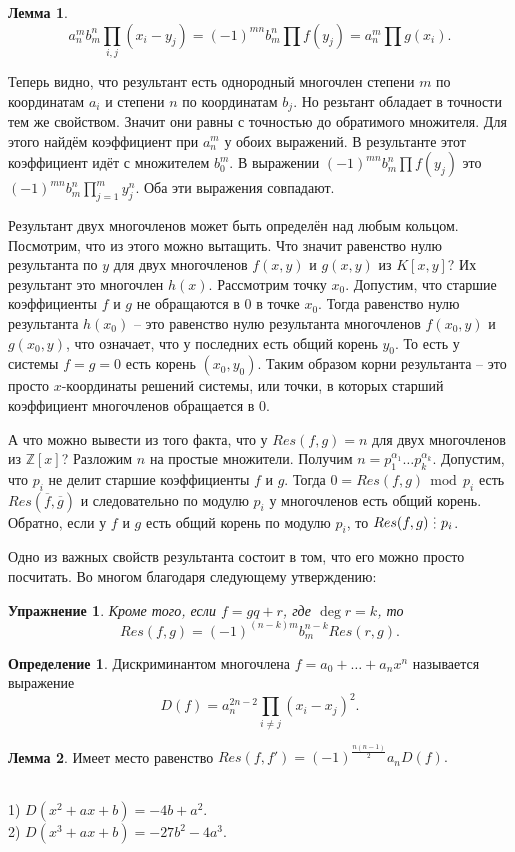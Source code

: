 \documentclass[10pt,a4paper,oneside]{book}
\newtheorem{upr}{Упражнение}
\theoremstyle{definition}
\newtheorem*{defn}{{\color{yellow!20!red} Определение}}
\newtheorem{lem}{Лемма}
\renewcommand{\mod}{\,\operatorname{mod}\,}
\newcommand{\mb}[1]{\mathbb{#1}}
\newcommand{\ovl}{\overline}
\newcommand{\di}{\mathop{\,\scalebox{0.85}{\raisebox{-1.2pt}[0.5\height]{\vdots}}\,}}
\def\exm{\noindent {\bf Примеры:}}
\def\dfn{\begin{defn}}
\def\edfn{\end{defn}}
\def\lm{\begin{lem}}
\def\elm{\end{lem}}
\def\bupr{\begin{upr}}
\def\eupr{\end{upr}}
\begin{document}
\lm  $$a_n^mb_m^n \prod_{i,j} (x_i-y_j)=(-1)^{mn}b_m^n \prod f(y_j)=a_n^m \prod g(x_i).$$ 
\elm

Теперь видно, что результант есть однородный многочлен степени $m$ по координатам $a_i$ и степени $n$ по координатам $b_j$. Но резьтант обладает в точности тем же свойством. Значит они равны с точностью до обратимого множителя. Для этого найдём коэффициент при $a_n^m$ у обоих выражений. В результанте этот коэффициент идёт с множителем $b_0^m$. В выражении  $(-1)^{mn}b_m^n \prod f(y_j)$ это $(-1)^{mn}b_m^n \prod_{j=1}^m y_j^n$. Оба эти выражения совпадают.

\endproof



Результант двух многочленов может быть определён над любым кольцом. Посмотрим, что из этого можно вытащить. Что значит равенство нулю результанта по $y$ для двух многочленов $f(x,y) $ и $g(x,y)$ из $K[x,y]$? Их результант это многочлен $h(x)$. Рассмотрим точку $x_0$. Допустим, что старшие коэффициенты $f$ и $g$ не обращаются в 0 в точке $x_0$. Тогда равенство нулю результанта $h(x_0)$ -- это равенство нулю результанта многочленов $f(x_0,y)$ и $g(x_0,y)$, что означает, что у последних есть общий корень $y_0$. То есть у системы $f=g=0$ есть корень $(x_0,y_0)$. Таким образом корни результанта -- это  просто $x$-координаты решений системы, или точки, в которых старший коэффициент многочленов обращается в 0.


А что можно вывести из того факта, что у $Res(f,g)=n$ для двух многочленов из $\mb Z[x]$? Разложим $n$ на простые множители. Получим $n=p_1^{\alpha_1} \dots p_k^{\alpha_k}$. Допустим, что $p_i$ не делит старшие коэффициенты $f$ и $g$. Тогда $0=Res(f,g) \mod p_i $ есть $Res(\ovl{f}, \ovl{g})$ и следовательно по модулю $p_i$ у многочленов есть общий корень. Обратно, если у $f$ и $g$ есть общий корень по модулю $p_i$, то $Res(f,g)\di p_i$.

Одно из важных свойств результанта состоит в том, что его можно просто посчитать. Во многом благодаря следующему утверждению:

\bupr Кроме того, если $f=gq+r$, где $\deg r=k$, то 
 $$Res(f,g)=(-1)^{(n-k)m}b_m^{n-k} Res(r,g).$$
\eupr

\dfn Дискриминантом многочлена $f=a_0+\dots +a_nx^n$ называется выражение 
$$D(f)=a_n^{2n-2}\prod_{i\neq j} (x_i-x_j)^2.$$
\edfn

\lm Имеет место равенство $Res(f,f')=(-1)^{\frac{n(n-1)}{2}} a_n D(f).$
\elm

\exm\\
1) $D(x^2+ax+b)=-4b+a^2$.\\
2) $D(x^3+ax+b)=-27b^2-4a^3$.\\
\end{document}
